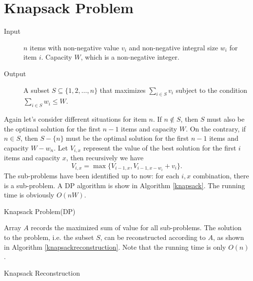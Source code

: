 \section{Knapsack Problem}
\begin{description}
\item[Input]$n$ items with non-negative value $v_i$ and non-negative integral size $w_i$ for item $i$. Capacity $W$, which is a non-negative integer.
\item[Output]A subset $S\subseteq\{1,2,\dots,n\}$ that maximizes $\sum\limits_{i\in S}v_i$ subject to the condition $\sum\limits_{i\in S}w_i\leq W$.
\end{description}
Again let's consider different situations for item $n$. If $n\notin S$, then $S$ must also be the optimal solution for the first $n-1$ items and capacity $W$. On the contrary, if $n\in S$, then $S-\{n\}$ must be the optimal solution for the first $n-1$ items and capacity $W-w_n$. Let $V_{i,x}$ represent the value of the best solution for the first $i$ items and capacity $x$, then recursively we have 
$$V_{i,x}=\max\{V_{i-1,x},V_{i-1,x-w_i}+v_i\}.$$
The sub-problems have been identified up to now: for each $i,x$ combination, there is a sub-problem. A DP algorithm is show in Algorithm \ref{knapsack}. The running time is obviously $O(nW)$.

\begin{algorithm}[ht]
\caption{Knapsack Problem(DP)}\label{knapsack}
\begin{algorithmic}[1]
\Else{}
\EndIf\EndFor\EndFor
\end{algorithmic}
\end{algorithm}

Array $A$ records the maximized sum of value for all sub-problems. The solution to the problem, i.e. the subset $S$, can be reconstructed according to $A$, as shown in Algorithm \ref{knapsackreconstruction}. Note that the running time is only $O(n)$.

\begin{algorithm}[ht]
\caption{Knapsack Reconstruction}\label{knapsackreconstruction}
\begin{algorithmic}[1]
\EndIf
{}
\EndWhile
\end{algorithmic}
\end{algorithm}

